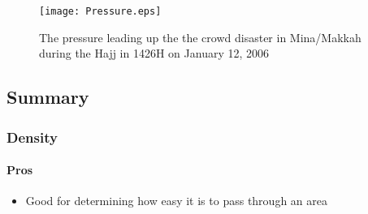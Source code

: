 \begin{figure}
    \centering
    \texttt{[image: Pressure.eps]}
    \caption{The pressure leading up the the crowd disaster in Mina/Makkah during the Hajj in 1426H on January 12, 2006 \cite{empircalstudy}}
    \label{mekkahCrowdDistaster206}
\end{figure}


\subsection{Summary}\label{sec:crowd_conditions_summary}


\subsubsection{Density}


\paragraph{Pros}
\begin{itemize}
    \item Good for determining how easy it is to pass through an area
\end{itemize}

